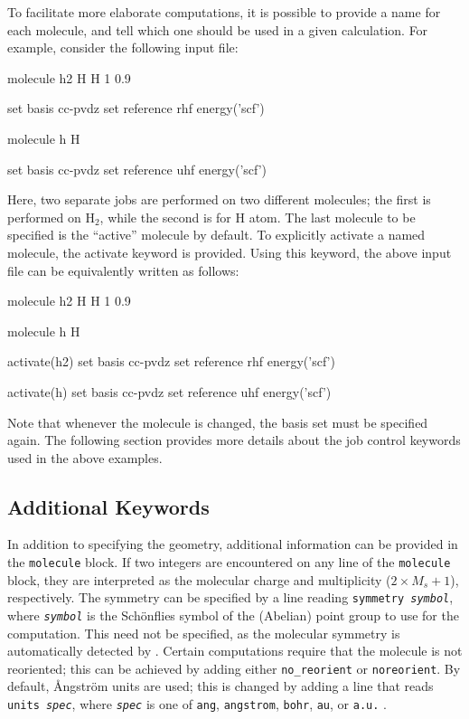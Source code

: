 To facilitate more elaborate computations, it is possible to provide a name for
each molecule, and tell \PSIfour which one should be used in a given
calculation. For example, consider the following input file:
\begin{Snippet}
molecule h2{
  H
  H 1 0.9
}


set basis cc-pvdz
set reference rhf
energy('scf')

molecule h{
  H
}

set basis cc-pvdz
set reference uhf
energy('scf')
\end{Snippet}
Here, two separate jobs are performed on two different molecules; the first is
performed on H$_2$, while the second is for H atom. The last molecule to be
specified is the ``active'' molecule by default. To explicitly activate a named
molecule, the activate keyword is provided. Using this keyword, the above input
file can be equivalently written as follows:
\begin{Snippet}
molecule h2{
  H
  H 1 0.9
}

molecule h{
  H
}

activate(h2)
set basis cc-pvdz
set reference rhf
energy('scf')

activate(h)
set basis cc-pvdz
set reference uhf
energy('scf')
\end{Snippet}
Note that whenever the molecule is changed, the basis set must be specified
again. The following section provides more details about the job control
keywords used in the above examples.

\subsection{Additional Keywords}

In addition to specifying the geometry, additional information can be provided
in the {\tt molecule} block. If two integers are encountered on any line of the
{\tt molecule} block, they are interpreted as the molecular charge and multiplicity
($2\times M_s + 1$), respectively. The symmetry can be specified by a line reading 
\texttt{symmetry \slshape symbol}, where \texttt{\slshape symbol} is
the Sch\"onflies symbol of the (Abelian) point group to use for the
computation. This need not be specified, as the molecular symmetry is
automatically detected by \PSIfour.  Certain computations require that the
molecule is not reoriented; this can be achieved by adding either
{\tt no\_reorient} or {\tt noreorient}. By default, \AA ngstr\"om units are used;
this is changed by adding a line that reads \texttt{units \slshape spec}, where
\texttt{\slshape spec} is one of {\tt ang}, {\tt angstrom}, {\tt bohr}, {\tt au}, or
{\tt a.u.} \hspace{2 mm}.

